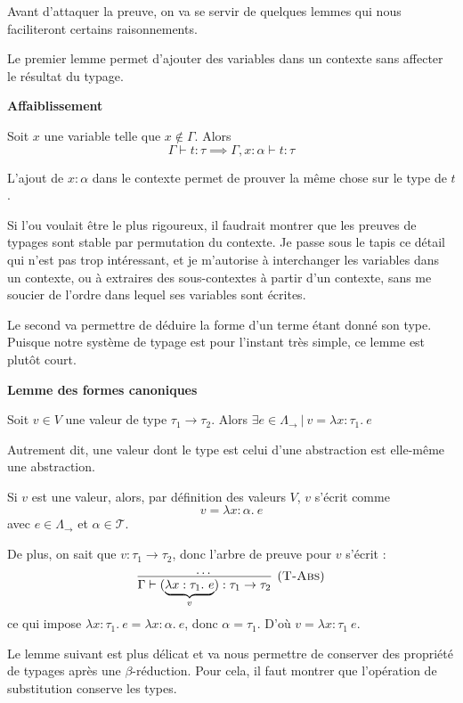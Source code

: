 \documentclass[11pt]{article}
\begin{document}
Avant d'attaquer la preuve, on va se servir de quelques lemmes qui nous faciliteront certains raisonnements.

Le premier lemme permet d'ajouter des variables dans un contexte sans affecter le résultat du typage.

\begin{lemma}
    \textbf{Affaiblissement}

    Soit $x$ une variable telle que $x\notin\Gamma$. Alors
    $$\Gamma\vdash t:\tau\implies \Gamma, x:\alpha\vdash t:\tau$$

    L'ajout de $x:\alpha$ dans le contexte permet de prouver la même chose sur le type de $t$.
\end{lemma}

Si l'ou voulait être le plus rigoureux, il faudrait montrer que les preuves de typages sont stable par permutation du contexte. Je passe sous le tapis ce détail qui n'est pas trop intéressant, et je m'autorise à interchanger les variables dans un contexte, ou à extraires des sous-contextes à partir d'un contexte, sans me soucier de l'ordre dans lequel ses variables sont écrites.

Le second va permettre de déduire la forme d'un terme étant donné son type. Puisque notre système de typage est pour l'instant très simple, ce lemme est plutôt court. 

\begin{lemma}
    \textbf{Lemme des formes canoniques}
    
    Soit $v\in V$ une valeur de type $\tau_1\to\tau_2$. Alors $\exists e\in\Lambda_\rightarrow~|~v=\lambda x:\tau_1.~e$

    Autrement dit, une valeur dont le type est celui d'une abstraction est elle-même une abstraction.

    \begin{preuve}
    Si $v$ est une valeur, alors, par définition des valeurs $V$, $v$ s'écrit comme 
    $$v=\lambda x:\alpha.~e$$
    avec $e\in\Lambda_\rightarrow$ et $\alpha\in\mathcal{T}$.
    
    De plus, on sait que $v:\tau_1\to\tau_2$, donc l'arbre de preuve pour $v$ s'écrit :
    $$\infer[(\text{\scshape{T-Abs}})]{\Gamma\vdash(\underbrace{\lambda x:\tau_1.~e}_v):\tau_1\to\tau_2}{\dots}$$
    ce qui impose $\lambda x: \tau_1.~e=\lambda x:\alpha.~e$, donc $\alpha = \tau_1$.
    D'où $v=\lambda x:\tau_1~e$.
    \end{preuve}
\end{lemma}

Le lemme suivant est plus délicat et va nous permettre de conserver des propriété de typages après une $\beta$-réduction. Pour cela, il faut montrer que l'opération de substitution conserve les types.
\end{document}
